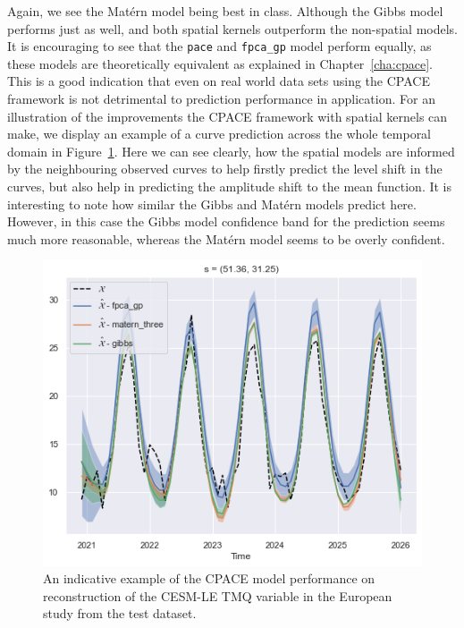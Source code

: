 Again, we see the Mat\'ern model being best in class.
Although the Gibbs model performs just as well, and both spatial kernels outperform the non-spatial models.
It is encouraging to see that the \verb*|pace| and \verb*|fpca_gp| model perform equally, as these models are theoretically equivalent as explained in Chapter~\ref{cha:cpace}.
This is a good indication that even on real world data sets using the CPACE framework is not detrimental to prediction performance in application.
For an illustration of the improvements the CPACE framework with spatial kernels can make, we display an example of a curve prediction across the whole temporal domain in Figure~\ref{fig:test_ex_tmq_eur}.
Here we can see clearly, how the spatial models are informed by the neighbouring observed curves to help firstly predict the level shift in the curves, but also help in predicting the amplitude shift to the mean function.
It is interesting to note how similar the Gibbs and Mat\'ern models predict here.
However, in this case the Gibbs model confidence band for the prediction seems much more reasonable, whereas the Mat\'ern model seems to be overly confident.

\begin{figure}
	\centering
	\includegraphics[width=\textwidth]{test_ex_tmq_eur}
	\caption[An indicative example of the CPACE model performance on reconstruction of the CESM-LE TMQ variable in the European study from the test dataset.]{An indicative example of the CPACE model performance on reconstruction of the CESM-LE TMQ variable in the European study from the test dataset.}
	\label{fig:test_ex_tmq_eur}
\end{figure}

